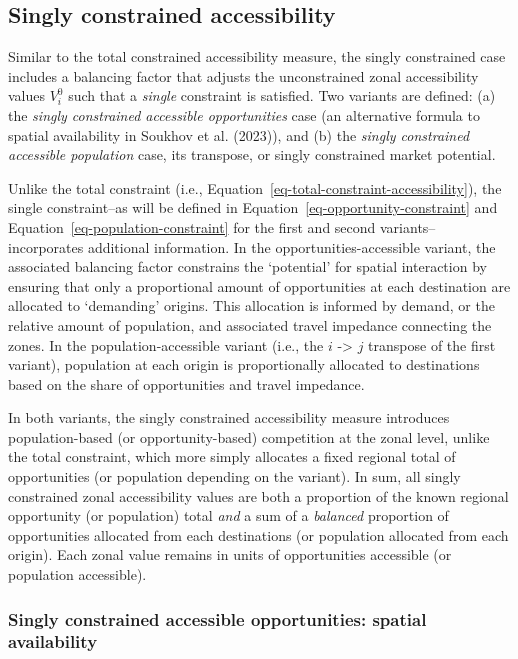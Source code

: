 \documentclass[
]{article}
\begin{document}
\subsection{Singly constrained
accessibility}\label{singly-constrained-accessibility}

Similar to the total constrained accessibility measure, the singly
constrained case includes a balancing factor that adjusts the
unconstrained zonal accessibility values \(V^0_i\) such that a
\emph{single} constraint is satisfied. Two variants are defined: (a) the
\emph{singly constrained accessible opportunities} case (an alternative
formula to spatial availability in Soukhov et al. (2023)), and (b) the
\emph{singly constrained accessible population} case, its transpose, or
singly constrained market potential.

Unlike the total constraint (i.e.,
Equation~\ref{eq-total-constraint-accessibility}), the single
constraint--as will be defined in
Equation~\ref{eq-opportunity-constraint} and
Equation~\ref{eq-population-constraint} for the first and second
variants-- incorporates additional information. In the
opportunities-accessible variant, the associated balancing factor
constrains the `potential' for spatial interaction by ensuring that only
a proportional amount of opportunities at each destination are allocated
to `demanding' origins. This allocation is informed by demand, or the
relative amount of population, and associated travel impedance
connecting the zones. In the population-accessible variant (i.e., the
\(i\) -\textgreater{} \(j\) transpose of the first variant), population
at each origin is proportionally allocated to destinations based on the
share of opportunities and travel impedance.

In both variants, the singly constrained accessibility measure
introduces population-based (or opportunity-based) competition at the
zonal level, unlike the total constraint, which more simply allocates a
fixed regional total of opportunities (or population depending on the
variant). In sum, all singly constrained zonal accessibility values are
both a proportion of the known regional opportunity (or population)
total \emph{and} a sum of a \emph{balanced} proportion of opportunities
allocated from each destinations (or population allocated from each
origin). Each zonal value remains in units of opportunities accessible
(or population accessible).

\subsubsection{Singly constrained accessible opportunities: spatial
availability}\label{singly-constrained-accessible-opportunities-spatial-availability}
\end{document}
